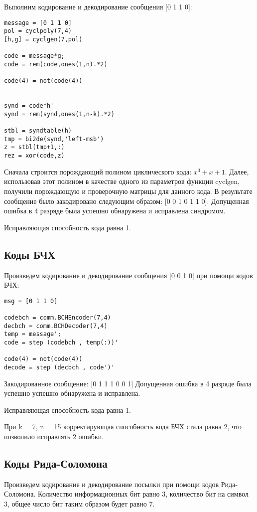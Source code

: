 \documentclass[10pt,a4paper,oneside]{article}
\begin{document}
Выполним кодирование и декодирование сообщения [0 1 1 0]:

 \begin{verbatim}
message = [0 1 1 0]
pol = cyclpoly(7,4)
[h,g] = cyclgen(7,pol)

code = message*g;
code = rem(code,ones(1,n).*2)

code(4) = not(code(4))


synd = code*h'
synd = rem(synd,ones(1,n-k).*2)

stbl = syndtable(h)
tmp = bi2de(synd,'left-msb')
z = stbl(tmp+1,:)
rez = xor(code,z)

 \end{verbatim}
Сначала строится порождающий полином циклического
кода: $x^3+x+1$.  Далее, использовав этот полином в качестве одного из параметров
функции cyclgen, получили порождающую и проверочную матрицы для данного кода. 
В результате сообщение было закодировано следующим образом: [0   0   1   0   1   1   0].
Допущенная ошибка в 4 разряде была успешно обнаружена и исправлена синдромом.

Исправляющая способность кода равна 1.


\subsection{Коды БЧХ}

Произведем кодирование и декодирование сообщения [0 0 1 0] при помощи кодов БЧХ:

 \begin{verbatim}
msg = [0 1 1 0]

codebch = comm.BCHEncoder(7,4)
decbch = comm.BCHDecoder(7,4)
temp = message';
code = step (codebch , temp(:))'

code(4) = not(code(4))
decode = step (decbch , code')'

 \end{verbatim}
Закодированное сообщение: [0   1   1   1   0   0  1]
Допущенная ошибка в 4 разряде была успешно успешно обнаружена и исправлена.

Исправляющая способность кода равна 1.

При  k = 7, n = 15 корректирующая способность кода БЧХ стала равна 2, что позволило исправлять 2 ошибки.

\subsection{Коды Рида-Соломона}

Произведем кодирование и декодирование посылки при помощи кодов Рида-Соломона. Количество информационных бит равно 3, количество бит на символ 3, общее число бит таким образом будет равно 7.
\end{document}
